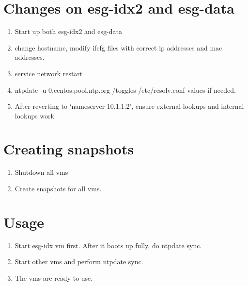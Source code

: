 \documentclass[12pt,oneside]{memoir}
\begin{document}
\section{Changes on esg-idx2 and esg-data}
\begin{enumerate}
\item Start up both esg-idx2 and esg-data
\item change hostname, modify ifcfg files with correct ip addresses and mac addresses.
\item service network restart
\item ntpdate -u 0.centos.pool.ntp.org /toggles /etc/resolv.conf values if needed.
\item After reverting to `nameserver 10.1.1.2', ensure external lookups and internal lookups work
\end{enumerate}
\section{Creating snapshots}
\begin{enumerate}
\item Shutdown all vms
\item Create snapshots for all vms.
\end{enumerate}
\section{Usage}
\begin{enumerate}
\item Start esg-idx vm first. After it boots up fully, do ntpdate sync. 
\item Start other vms and perform ntpdate sync.
\item The vms are ready to use.
\end{enumerate}
\end{document}
